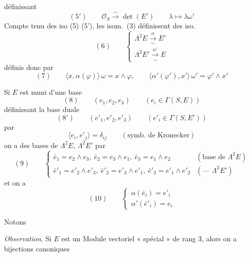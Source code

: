 \documentclass[11pt,a4paper]{article}
\begin{document}
définissant
\[
  (5') \qquad \mathcal{O}_S \xrightarrow{\ \sim\ } \underline{\det}(E') \qquad \lambda \longmapsto \lambda\omega'
\]
Compte tenu des iso (5) (5'), les isom.\ (3) définissent des iso.
\[
  (6) \qquad
  \begin{cases}
    \Lambda^2 E \xrightarrow[\sim]{\ \alpha\ } E' \\
    \Lambda^2 E' \xrightarrow[\sim]{\ \alpha'\ } E
  \end{cases}
\]
définis donc par
\[
  (7) \qquad \langle x, \alpha(\varphi) \rangle\, \omega = x \wedge \varphi , \qquad
  \langle \alpha'(\varphi'), x' \rangle\, \omega' = \varphi' \wedge x'
\]

Si $E$ est muni d'une base
\[
  (8) \qquad (e_1, e_2, e_3) \qquad (e_i \in \Gamma(S, E))
\]
définissant la base duale
\[
  (8') \qquad (e'_1, e'_2, e'_3) \qquad (e'_i \in \Gamma(S, E'))
\]
par
\[
  \langle e_i, e'_j \rangle = \delta_{ij} \qquad (\text{symb.\ de Kronecker})
\]
on a des bases de $\Lambda^2 E$, $\Lambda^2 E'$ par
\[
  (9) \qquad
  \begin{cases}
    \bar{e}_1 = e_2 \wedge e_3 ,\ \bar{e}_2 = e_3 \wedge e_1 ,\ \bar{e}_3 = e_1 \wedge e_2 & (\text{base de } \Lambda^2 E) \\
    \bar{e}'_1 = e'_2 \wedge e'_3 ,\ \bar{e}'_2 = e'_3 \wedge e'_1 ,\ \bar{e}'_3 = e'_1 \wedge e'_2 & (\text{--- } \Lambda^2 E')
  \end{cases}
\]
et on a
\[
  (10) \qquad
  \begin{cases}
    \alpha(\bar{e}_i) = e'_i \\
    \alpha'(\bar{e}'_i) = e_i
  \end{cases}
\]

Notons \struck{\ill{}}

\emph{Observation.} Si $E$ est un Module vectoriel « spécial » de rang 3,
alors on a  bijections canoniques

\end{document}
